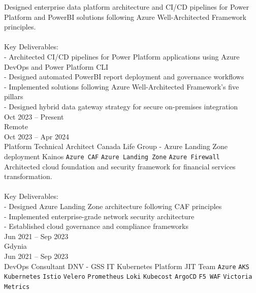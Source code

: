 \documentclass[9pt]{style/developercv}
\begin{document}
\begin{entrylist}
{      Designed enterprise data platform architecture and CI/CD pipelines for Power Platform and PowerBI solutions following Azure Well-Architected Framework principles.\\
      \\
      Key Deliverables:\\
      - Architected CI/CD pipelines for Power Platform applications using Azure DevOps and Power Platform CLI\\
      - Designed automated PowerBI report deployment and governance workflows\\
      - Implemented solutions following Azure Well-Architected Framework's five pillars\\
      - Designed hybrid data gateway strategy for secure on-premises integration\\
    }
    \entry
    {Oct 2023 -- Present\\\footnotesize{Remote}
    \\Oct 2023  -- Apr 2024\\\footnotesize{Platform Technical Architect}}
        {Canada Life Group - Azure Landing Zone deployment}
        {Kainos}
        {
            \texttt{Azure CAF}\slashsep
      \texttt{Azure Landing Zone}\slashsep
            \texttt{Azure Firewall}\\

      Architected cloud foundation and security framework for financial services transformation.\\
      \\
      Key Deliverables:\\
      - Designed Azure Landing Zone architecture following CAF principles\\
      - Implemented enterprise-grade network security architecture\\
      - Established cloud governance and compliance frameworks\\
        }
    \entry
    {Jun 2021 -- Sep 2023\\\footnotesize{Gdynia}
    \\Jun 2021 -- Sep 2023\\\footnotesize{DevOps Consultant}}
        {DNV - GSS IT Kubernetes Platform}
        {JIT Team}
        {
            \texttt{Azure}\slashsep
      \texttt{AKS}\slashsep
            \texttt{Kubernetes}\slashsep
            \texttt{Istio}\slashsep
            \texttt{Velero}\slashsep
      \texttt{Prometheus}\slashsep
      \texttt{Loki}\slashsep
      \texttt{Kubecost}\slashsep
      \texttt{ArgoCD}\slashsep
      \texttt{F5 WAF}\slashsep
      \texttt{Victoria Metrics}\\

}
\end{entrylist}
\end{document}
